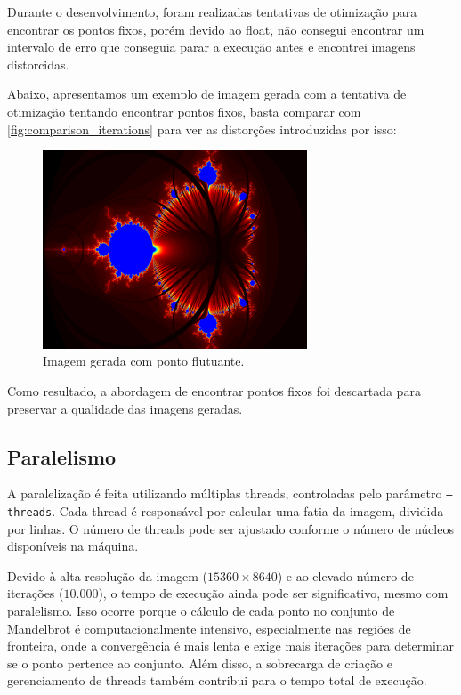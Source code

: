 Durante o desenvolvimento, foram realizadas tentativas de otimização para encontrar os pontos fixos, porém devido ao float, não consegui encontrar um intervalo de erro que conseguia parar a execução antes e encontrei imagens distorcidas.

Abaixo, apresentamos um exemplo de imagem gerada com a tentativa de otimização tentando encontrar pontos fixos, basta comparar com \autoref{fig:comparison_iterations} para ver as distorções introduzidas por isso:
\begin{figure}[H]
    \centering
    \includegraphics[width=0.7\textwidth]{figures/comparacao/mandelbrot_float.png}
    \caption{Imagem gerada com ponto flutuante.}
    \label{fig:comparison_float}
\end{figure}

Como resultado, a abordagem de encontrar pontos fixos foi descartada para preservar a qualidade das imagens geradas.
\subsection{Paralelismo}

A paralelização é feita utilizando múltiplas threads, controladas pelo parâmetro \texttt{--threads}. Cada thread é responsável por calcular uma fatia da imagem, dividida por linhas. O número de threads pode ser ajustado conforme o número de núcleos disponíveis na máquina.

Devido à alta resolução da imagem (\( 15360 \times 8640 \)) e ao elevado número de iterações (\( 10.000 \)), o tempo de execução ainda pode ser significativo, mesmo com paralelismo. Isso ocorre porque o cálculo de cada ponto no conjunto de Mandelbrot é computacionalmente intensivo, especialmente nas regiões de fronteira, onde a convergência é mais lenta e exige mais iterações para determinar se o ponto pertence ao conjunto. Além disso, a sobrecarga de criação e gerenciamento de threads também contribui para o tempo total de execução.
